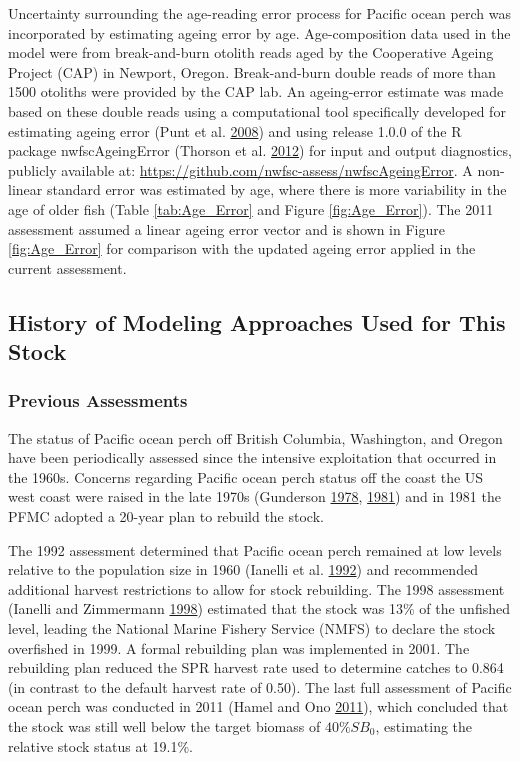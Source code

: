 \documentclass[12pt,]{article}
\begin{document}
Uncertainty surrounding the age-reading error process for Pacific ocean
perch was incorporated by estimating ageing error by age.
Age-composition data used in the model were from break-and-burn otolith
reads aged by the Cooperative Ageing Project (CAP) in Newport, Oregon.
Break-and-burn double reads of more than 1500 otoliths were provided by
the CAP lab. An ageing-error estimate was made based on these double
reads using a computational tool specifically developed for estimating
ageing error (Punt et al.
\protect\hyperlink{ref-punt_quantifying_2008}{2008}) and using release
1.0.0 of the R package nwfscAgeingError (Thorson et al.
\protect\hyperlink{ref-thorson_nwfscageingerror:_2012}{2012}) for input
and output diagnostics, publicly available at:
\url{https://github.com/nwfsc-assess/nwfscAgeingError}. A non-linear
standard error was estimated by age, where there is more variability in
the age of older fish (Table \ref{tab:Age_Error} and Figure
\ref{fig:Age_Error}). The 2011 assessment assumed a linear ageing error
vector and is shown in Figure \ref{fig:Age_Error} for comparison with
the updated ageing error applied in the current assessment.

\subsection{History of Modeling Approaches Used for This
Stock}\label{history-of-modeling-approaches-used-for-this-stock}

\subsubsection{Previous Assessments}\label{previous-assessments}

The status of Pacific ocean perch off British Columbia, Washington, and
Oregon have been periodically assessed since the intensive exploitation
that occurred in the 1960s. Concerns regarding Pacific ocean perch
status off the coast the US west coast were raised in the late 1970s
(Gunderson \protect\hyperlink{ref-gunderson_results_1978}{1978},
\protect\hyperlink{ref-gunderson_updated_1981}{1981}) and in 1981 the
PFMC adopted a 20-year plan to rebuild the stock.

The 1992 assessment determined that Pacific ocean perch remained at low
levels relative to the population size in 1960 (Ianelli et al.
\protect\hyperlink{ref-ianelli_status_1992}{1992}) and recommended
additional harvest restrictions to allow for stock rebuilding. The 1998
assessment (Ianelli and Zimmermann
\protect\hyperlink{ref-ianelli_status_1998}{1998}) estimated that the
stock was 13\% of the unfished level, leading the National Marine
Fishery Service (NMFS) to declare the stock overfished in 1999. A formal
rebuilding plan was implemented in 2001. The rebuilding plan reduced the
SPR harvest rate used to determine catches to 0.864 (in contrast to the
default harvest rate of 0.50). The last full assessment of Pacific ocean
perch was conducted in 2011 (Hamel and Ono
\protect\hyperlink{ref-hamel_stock_2011}{2011}), which concluded that
the stock was still well below the target biomass of \(40\%SB_{0}\),
estimating the relative stock status at 19.1\%.
\end{document}
